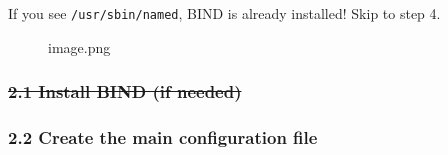 \begin{Shaded}
\begin{Highlighting}[]

\PreprocessorTok{*}
\PreprocessorTok{*}
\end{Highlighting}
\end{Shaded}

If you see \texttt{/usr/sbin/named}, BIND is already installed! Skip to
step 4.

\begin{figure}
\centering
{}
\caption{image.png}
\end{figure}

\subsubsection{\texorpdfstring{\st{2.1 Install BIND (if
needed)}}{2.1 Install BIND (if needed)}}\label{install-bind-if-needed}

\begin{Shaded}
\begin{Highlighting}[]
\PreprocessorTok{*}
\PreprocessorTok{*}
\end{Highlighting}
\end{Shaded}

\subsubsection{2.2 Create the main configuration
file}\label{create-the-main-configuration-file}


